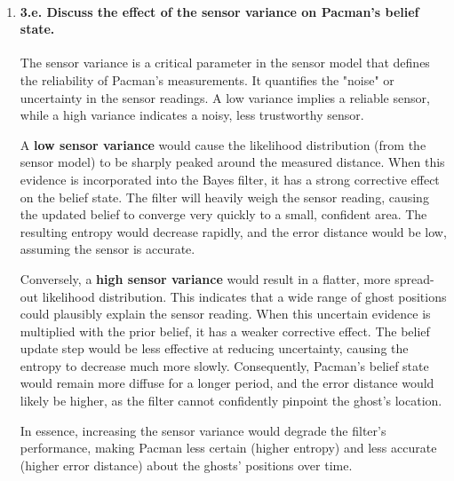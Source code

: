 \begin{enumerate}[label=\alph*.,leftmargin=*]
    Comparing the layouts, we observe that both entropy and error distance are generally lower in the \texttt{large\_filter\_walls} layout. The presence of more walls restricts the possible movements for all ghost types, effectively reducing the branching factor of possible next states. This constraint aids the filter by pruning the hypothesis space, leading to a faster convergence and a more accurate belief state for all ghost types compared to the more open \texttt{large\_filter} layout.

    \item \paragraph{3.e. Discuss the effect of the sensor variance on Pacman's belief state.}
    The sensor variance is a critical parameter in the sensor model that defines the reliability of Pacman's measurements. It quantifies the "noise" or uncertainty in the sensor readings. A low variance implies a reliable sensor, while a high variance indicates a noisy, less trustworthy sensor.
    
    A \textbf{low sensor variance} would cause the likelihood distribution (from the sensor model) to be sharply peaked around the measured distance. When this evidence is incorporated into the Bayes filter, it has a strong corrective effect on the belief state. The filter will heavily weigh the sensor reading, causing the updated belief to converge very quickly to a small, confident area. The resulting entropy would decrease rapidly, and the error distance would be low, assuming the sensor is accurate.
    
    Conversely, a \textbf{high sensor variance} would result in a flatter, more spread-out likelihood distribution. This indicates that a wide range of ghost positions could plausibly explain the sensor reading. When this uncertain evidence is multiplied with the prior belief, it has a weaker corrective effect. The belief update step would be less effective at reducing uncertainty, causing the entropy to decrease much more slowly. Consequently, Pacman's belief state would remain more diffuse for a longer period, and the error distance would likely be higher, as the filter cannot confidently pinpoint the ghost's location.
    
    In essence, increasing the sensor variance would degrade the filter's performance, making Pacman less certain (higher entropy) and less accurate (higher error distance) about the ghosts' positions over time.


\end{enumerate}
